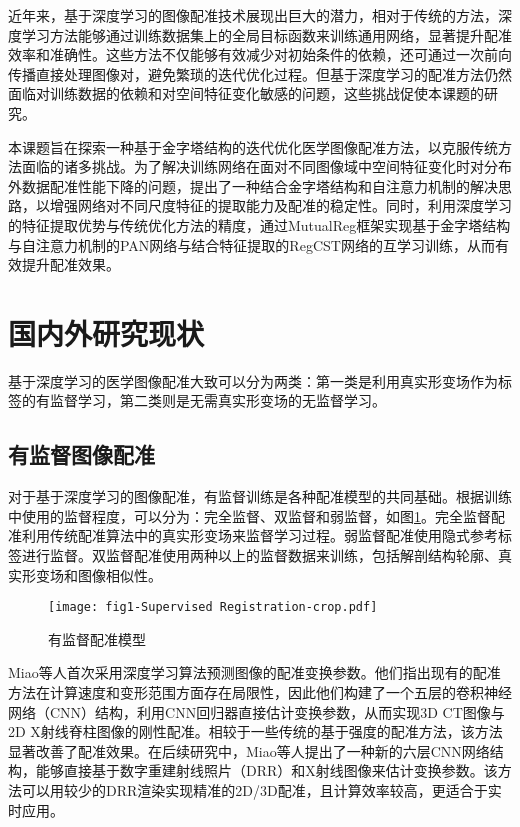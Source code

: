 近年来，基于深度学习的图像配准技术展现出巨大的潜力，相对于传统的方法，深度学习方法能够通过训练数据集上的全局目标函数来训练通用网络，显著提升配准效率和准确性。这些方法不仅能够有效减少对初始条件的依赖，还可通过一次前向传播直接处理图像对，避免繁琐的迭代优化过程。但基于深度学习的配准方法仍然面临对训练数据的依赖和对空间特征变化敏感的问题，这些挑战促使本课题的研究。

本课题旨在探索一种基于金字塔结构的迭代优化医学图像配准方法，以克服传统方法面临的诸多挑战。为了解决训练网络在面对不同图像域中空间特征变化时对分布外数据配准性能下降的问题，提出了一种结合金字塔结构和自注意力机制的解决思路，以增强网络对不同尺度特征的提取能力及配准的稳定性。同时，利用深度学习的特征提取优势与传统优化方法的精度，通过MutualReg框架\cite{liu2024mutualreg}实现基于金字塔结构与自注意力机制的PAN网络\cite{wang2024pyramid}与结合特征提取的RegCST网络\cite{bigalke2023unsupervised}的互学习训练，从而有效提升配准效果。


\section{国内外研究现状}

基于深度学习的医学图像配准大致可以分为两类：第一类是利用真实形变场作为标签的有监督学习，第二类则是无需真实形变场的无监督学习。

\subsection{有监督图像配准}

对于基于深度学习的图像配准，有监督训练是各种配准模型的共同基础。根据训练中使用的监督程度，可以分为：完全监督、双监督和弱监督，如图\ref{fig:1}。完全监督配准利用传统配准算法中的真实形变场来监督学习过程。弱监督配准使用隐式参考标签进行监督。双监督配准使用两种以上的监督数据来训练，包括解剖结构轮廓、真实形变场和图像相似性。

\begin{figure}[h]
    \centering
    \texttt{[image: fig1-Supervised Registration-crop.pdf]}
    \caption{有监督配准模型}
    \label{fig:1}
\end{figure}

Miao等人首次采用深度学习算法预测图像的配准变换参数。他们指出现有的配准方法在计算速度和变形范围方面存在局限性，因此他们构建了一个五层的卷积神经网络（CNN）结构，利用CNN回归器直接估计变换参数，从而实现3D CT图像与2D X射线脊柱图像的刚性配准。相较于一些传统的基于强度的配准方法，该方法显著改善了配准效果\cite{miao2016cnn}。在后续研究中\cite{miao2016real}，Miao等人提出了一种新的六层CNN网络结构，能够直接基于数字重建射线照片（DRR）和X射线图像来估计变换参数。该方法可以用较少的DRR渲染实现精准的2D/3D配准，且计算效率较高，更适合于实时应用。

